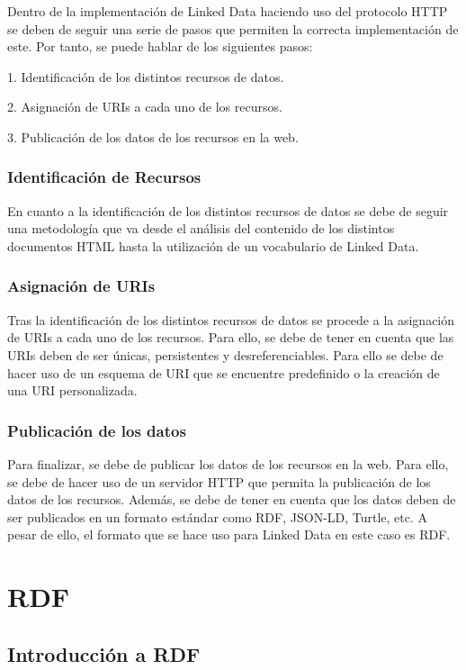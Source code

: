 \documentclass[11pt]{report}
\begin{document}
Dentro de la implementación de Linked Data haciendo uso del protocolo HTTP se deben de seguir una serie de pasos que permiten la correcta implementación de este. Por tanto, se puede hablar de los siguientes pasos:

1. Identificación de los distintos recursos de datos.

2. Asignación de URIs a cada uno de los recursos.

3. Publicación de los datos de los recursos en la web.

\subsection{Identificación de Recursos}

En cuanto a la identificación de los distintos recursos de datos se debe de seguir una metodología que va desde el análisis del contenido de los distintos documentos HTML hasta la utilización de un vocabulario de Linked Data.

\subsection{Asignación de URIs}

Tras la identificación de los distintos recursos de datos se procede a la asignación de URIs a cada uno de los recursos. Para ello, se debe de tener en cuenta que las URIs deben de ser únicas, persistentes y desreferenciables. Para ello se debe de hacer uso de un esquema de URI que se encuentre predefinido \cite{16} o la creación de una URI personalizada.

\subsection{Publicación de los datos}

Para finalizar, se debe de publicar los datos de los recursos en la web. Para ello, se debe de hacer uso de un servidor HTTP que permita la publicación de los datos de los recursos. Además, se debe de tener en cuenta que los datos deben de ser publicados en un formato estándar como RDF, JSON-LD, Turtle, etc. A pesar de ello, el formato que se hace uso para Linked Data en este caso es RDF.

\chapter{RDF}

\section{Introducción a RDF}
\end{document}
